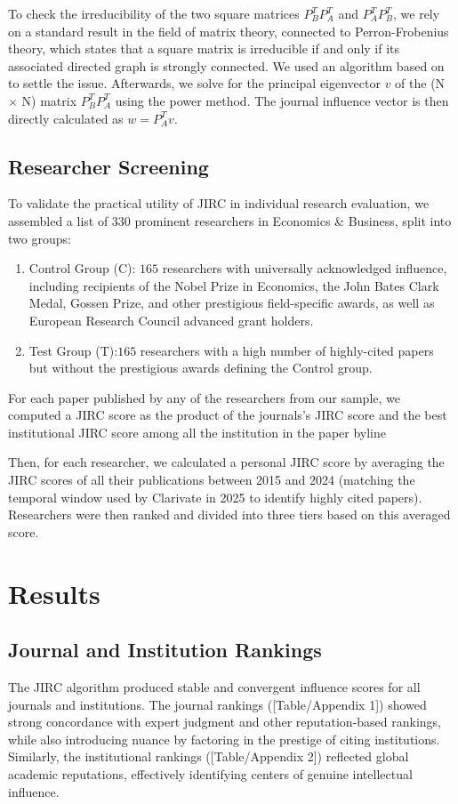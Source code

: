 \documentclass[10pt]{article}
\begin{document}
To check the irreducibility of the two square matrices \(P_B^T P_A^T\) and \(P_A^T P_B^T\), we rely on a standard result in the field of matrix theory, connected to Perron-Frobenius theory, which states that a square matrix is irreducible if and only if its associated directed graph is strongly connected. We  used an algorithm based on \cite{Dijkstra} to settle the issue. Afterwards,
we solve for the principal eigenvector $v$ of the (N × N) matrix \(P_B^T P_A^T\) using the power method. The journal influence vector is then directly calculated as \(w = P_A^T v\).

\subsection{Researcher Screening}
To validate the practical utility of JIRC in individual research evaluation, we assembled a list of  330 prominent researchers in Economics \& Business, split into two groups:
\begin{enumerate}
  \item Control Group (C): $165$ researchers with universally acknowledged influence, including recipients of the Nobel Prize in Economics, the John Bates Clark Medal, Gossen Prize, and other prestigious field-specific awards, as well as European Research Council advanced grant holders.
  \item Test Group (T):$165$ researchers with a high number of highly-cited papers but without the prestigious awards defining the Control group.
\end{enumerate}
For each paper published by any of the researchers from our sample, we computed a JIRC score as the product of the journals's JIRC score and the best institutional JIRC score among all the institution in the paper byline

Then, for each researcher, we calculated a personal JIRC score by averaging the JIRC scores of all their publications between 2015 and 2024 (matching the  temporal window used by Clarivate in 2025 to identify highly cited papers). Researchers were then ranked and divided into three tiers based on this averaged score.

\section{Results}
\subsection{Journal and Institution Rankings}
The JIRC algorithm produced stable and convergent influence scores for all journals and institutions. The journal rankings ([Table/Appendix 1]) showed strong concordance with expert judgment and other reputation-based rankings, while also introducing nuance by factoring in the prestige of citing institutions. Similarly, the institutional rankings ([Table/Appendix 2]) reflected global academic reputations, effectively identifying centers of genuine intellectual influence.
\end{document}
